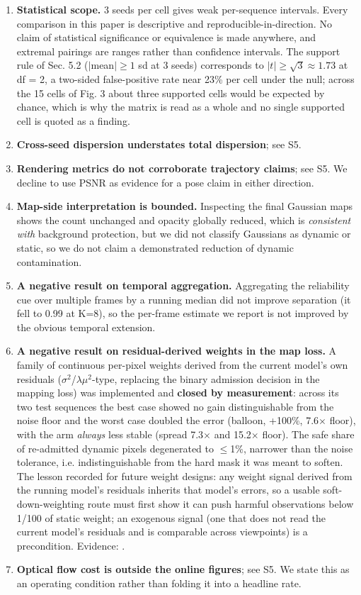\begin{enumerate}
\item \textbf{Statistical scope.} 3 seeds per cell gives weak per-sequence intervals. Every comparison in this paper is descriptive and reproducible-in-direction. No claim of statistical significance or equivalence is made anywhere, and extremal pairings are ranges rather than confidence intervals. The support rule of Sec. 5.2 ($|$mean$| \ge 1$ sd at 3 seeds) corresponds to $|t| \ge \sqrt{3} \approx 1.73$ at df = 2, a two-sided false-positive rate near 23\% per cell under the null; across the 15 cells of Fig. 3 about three supported cells would be expected by chance, which is why the matrix is read as a whole and no single supported cell is quoted as a finding.
\item \textbf{Cross-seed dispersion understates total dispersion}; see S5.
\item \textbf{Rendering metrics do not corroborate trajectory claims}; see S5. We decline to use PSNR as evidence for a pose claim in either direction.
\item \textbf{Map-side interpretation is bounded.} Inspecting the final Gaussian maps shows the count unchanged and opacity globally reduced, which is \emph{consistent with} background protection, but we did not classify Gaussians as dynamic or static, so we do not claim a demonstrated reduction of dynamic contamination.
\item \textbf{A negative result on temporal aggregation.} Aggregating the reliability cue over multiple frames by a running median did not improve separation (it fell to 0.99 at K=8), so the per-frame estimate we report is not improved by the obvious temporal extension.
\item \textbf{A negative result on residual-derived weights in the map loss.} A family of continuous per-pixel weights derived from the current model's own residuals ($\sigma$$^2$/$\lambda$$\mu$$^2$-type, replacing the binary admission decision in the mapping loss) was implemented and \textbf{closed by measurement}: across its two test sequences the best case showed no gain distinguishable from the noise floor and the worst case doubled the error (balloon, +100\%, 7.6$\times$ floor), with the arm \emph{always} less stable (spread 7.3$\times$ and 15.2$\times$ floor). The safe share of re-admitted dynamic pixels degenerated to $\le$1\%, narrower than the noise tolerance, i.e. indistinguishable from the hard mask it was meant to soften. The lesson recorded for future weight designs: any weight signal derived from the running model's residuals inherits that model's errors, so a usable soft-down-weighting route must first show it can push harmful observations below 1/100 of static weight; an exogenous signal (one that does not read the current model's residuals and is comparable across viewpoints) is a precondition. Evidence: .
\item \textbf{Optical flow cost is outside the online figures}; see S5. We state this as an operating condition rather than folding it into a headline rate.
\end{enumerate}


